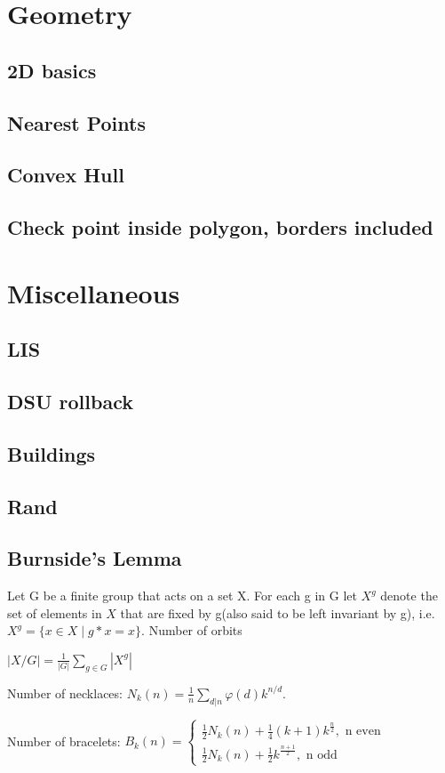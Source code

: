 \documentclass[a4paper,10pt,oneside]{article}
\newcommand\includes[2]{
   \subsection{#1}
   
}
\begin{document}
\begin{multicols}{2}
\section{Geometry}
\includes{2D basics}{code/geometry/2D.cpp}
\includes{Nearest Points}{code/geometry/near.cpp}
\includes{Convex Hull}{code/geometry/convexhull.cpp}
\includes{Check point inside polygon, borders included}{code/geometry/in_poly.cpp}

\section{Miscellaneous}
\includes{LIS}{code/misc/lis.cpp}
\includes{DSU rollback}{code/misc/bipar.cpp}
\includes{Buildings}{code/misc/burn.cpp}
\includes{Rand}{code/misc/rand.cpp}

\subsection{Burnside's Lemma}
Let G be a finite group that acts on a set X. For each g in G let $X^g$ denote the set of elements in $X$ that are fixed by g(also said to be left invariant by g), i.e. $X^g = \{x \in X \mid g*x = x \}$. Number of orbits

$\mid X / G \mid = \frac{1}{|G|} \sum_{g \in G}{|X^g|}$

Number of necklaces: $N_k(n) = \frac{1}{n} \sum_{d|n}{\varphi(d)k^{n/d}}$.

Number of bracelets: $B_k(n) = 
\begin{cases}
\frac{1}{2}N_k(n) + \frac{1}{4}(k+1)k^{\frac{n}{2}},\text{ n even} \\
\frac{1}{2}N_k(n) + \frac{1}{2}k^{\frac{n+1}{2}},\text{ n odd}

\end{cases}$

\end{multicols}
\end{document}
